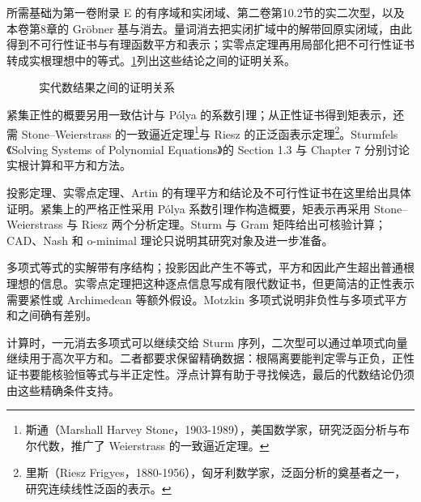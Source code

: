 \ProseParagraphBreak

所需基础为第一卷附录 E 的有序域和实闭域、第二卷第10.2节的实二次型，以及本卷第8章的 Gröbner 基与消去。量词消去把实闭扩域中的解带回原实闭域，由此得到不可行性证书与有理函数平方和表示；实零点定理再用局部化把不可行性证书转成实根理想中的等式。\cref{b3:fig:G-proof-dependencies}列出这些结论之间的证明关系。

\begin{figure}[htbp]
	\centering
	
	\caption{实代数结果之间的证明关系}
	\label{b3:fig:G-proof-dependencies}
\end{figure}

\ProseParagraphBreak
紧集正性的概要另用一致估计与 P\'olya 的系数引理；从正性证书得到矩表示，还需 Stone--Weierstrass 的一致逼近定理\footnote{斯通（Marshall Harvey Stone，1903-1989），美国数学家，研究泛函分析与布尔代数，推广了 Weierstrass 的一致逼近定理。}与 Riesz 的正泛函表示定理\footnote{里斯（Riesz Frigyes，1880-1956），匈牙利数学家，泛函分析的奠基者之一，研究连续线性泛函的表示。}。Sturmfels《Solving Systems of Polynomial Equations》的 Section 1.3 与 Chapter 7 分别讨论实根计算和平方和方法\cite[Section 1.3; Chapter 7]{Sturmfels2002PolynomialEquations}。

\ProseParagraphBreak
投影定理、实零点定理、Artin 的有理平方和结论及不可行性证书在这里给出具体证明。紧集上的严格正性采用 P\'olya 系数引理作构造概要，矩表示再采用 Stone--Weierstrass 与 Riesz 两个分析定理。Sturm 与 Gram 矩阵给出可核验计算；CAD、Nash 和 o-minimal 理论只说明其研究对象及进一步准备。








\begin{chaptersummary}
	多项式等式的实解带有序结构；投影因此产生不等式，平方和因此产生超出普通根理想的信息。实零点定理把这种逐点信息写成有限代数证书，但更简洁的正性表示需要紧性或 Archimedean 等额外假设。Motzkin 多项式说明非负性与多项式平方和之间确有差别。

	\ProseParagraphBreak
	计算时，一元消去多项式可以继续交给 Sturm 序列，二次型可以通过单项式向量继续用于高次平方和。二者都要求保留精确数据：根隔离要能判定零与正负，正性证书要能核验恒等式与半正定性。浮点计算有助于寻找候选，最后的代数结论仍须由这些精确条件支持。
\end{chaptersummary}

\BookExercises

